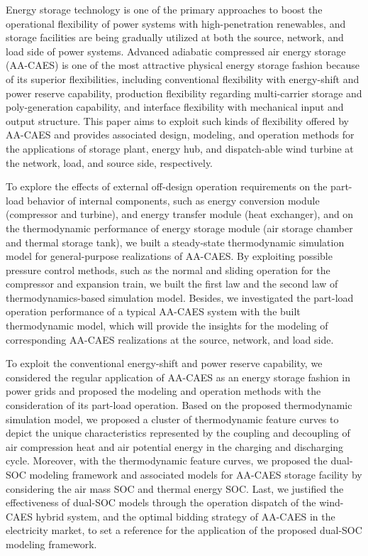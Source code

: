 
\begin{eabstract}

Energy storage technology is one of the primary approaches to boost the operational flexibility of power systems with high-penetration renewables, and storage facilities are being gradually utilized at both the source, network, and load side of power systems. Advanced adiabatic compressed air energy storage (AA-CAES) is one of the most attractive physical energy storage fashion because of its superior flexibilities, including conventional flexibility with energy-shift and power reserve capability, production flexibility regarding multi-carrier storage and poly-generation capability, and interface flexibility with mechanical input and output structure. This paper aims to exploit such kinds of flexibility offered by AA-CAES and provides associated design, modeling, and operation methods for the applications of storage plant, energy hub, and dispatch-able wind turbine at the network, load, and source side, respectively.

To explore the effects of external off-design operation requirements on the part-load behavior of internal components, such as energy conversion module (compressor and turbine), and energy transfer module (heat exchanger), and on the thermodynamic performance of energy storage module (air storage chamber and thermal storage tank), we built a steady-state thermodynamic simulation model for general-purpose realizations of AA-CAES. By exploiting possible pressure control methods, such as the normal and sliding operation for the compressor and expansion train, we built the first law and the second law of thermodynamics-based simulation model. Besides, we investigated the part-load operation performance of a typical AA-CAES system with the built thermodynamic model, which will provide the insights for the modeling of corresponding AA-CAES realizations at the source, network, and load side.

To exploit the conventional energy-shift and power reserve capability, we considered the regular application of AA-CAES as an energy storage fashion in power grids and proposed the modeling and operation methods with the consideration of its part-load operation. Based on the proposed thermodynamic simulation model, we proposed a cluster of thermodynamic feature curves to depict the unique characteristics represented by the coupling and decoupling of air compression heat and air potential energy in the charging and discharging cycle. Moreover, with the thermodynamic feature curves, we proposed the dual-SOC modeling framework and associated models for AA-CAES storage facility by considering the air mass SOC and thermal energy SOC. Last, we justified the effectiveness of dual-SOC models through the operation dispatch of the wind-CAES hybrid system, and the optimal bidding strategy of AA-CAES in the electricity market, to set a reference for the application of the proposed dual-SOC modeling framework.


\end{eabstract}
